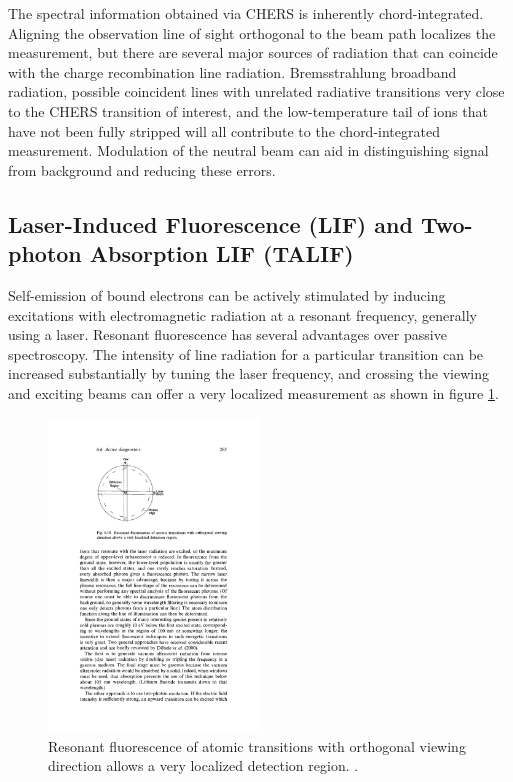 \documentclass{jpp}
\begin{document}
The spectral information obtained via CHERS is inherently chord-integrated. Aligning the observation line of sight orthogonal to the beam path localizes the measurement, but there are several major sources of radiation that can coincide with the charge recombination line radiation. Bremsstrahlung broadband radiation, possible coincident lines with unrelated radiative transitions very close to the CHERS transition of interest, and the low-temperature tail of ions that have not been fully stripped will all contribute to the chord-integrated measurement. Modulation of the neutral beam can aid in distinguishing signal from background and reducing these errors.


\subsection{Laser-Induced Fluorescence (LIF) and Two-photon Absorption LIF (TALIF)}

Self-emission of bound electrons can be actively stimulated by inducing excitations with electromagnetic radiation at a resonant frequency, generally using a laser. Resonant fluorescence has several advantages over passive spectroscopy. The intensity of line radiation for a particular transition can be increased substantially by tuning the laser frequency, and crossing the viewing and exciting beams can offer a very localized measurement as shown in figure \ref{fig:lif}. 

\begin{figure}
  \centering
  \includegraphics[width=0.5\textwidth]{lif-localized-region.pdf}%
  \caption{Resonant fluorescence of atomic transitions with orthogonal viewing direction allows a very localized detection region. \citep{Hutchinson_2002}.}
\label{fig:lif}
\end{figure}
\end{document}
